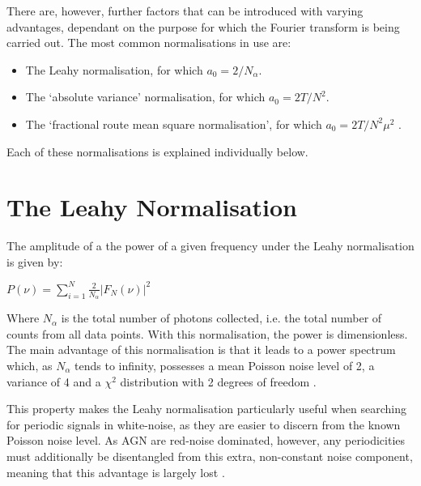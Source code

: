 \documentclass[letters,useAMS,usenatbib]{samnote}
\begin{document}
\setlength\parindent{20pt}
There are, however, further factors that can be introduced with varying advantages, dependant on the purpose for which the Fourier transform is being carried out. The most common normalisations in use are: \\
\begin{itemize}
\setlength{\itemindent}{0em}

\item The Leahy normalisation, for which $a_0 = 2/N_{\alpha}$\citep{leahy}.
\\ 
\item The `absolute variance' normalisation, for which $a_0 = 2T/N^2$. 
\\
\item The `fractional route mean square normalisation', for which $a_0 = 2T/N^2\mu^2$ \citep{vanderklis}.

\end{itemize}

\setlength\parindent{0pt}
Each of these normalisations is explained individually below.


\section{The Leahy Normalisation}

The amplitude of a the power of a given frequency under the Leahy normalisation is given by:

\vspace{\baselineskip}
\setlength\parindent{20pt}
$P(\nu)= \sum\limits_{i=1}^N \displaystyle\frac{2}{N_{\alpha}} |F_N(\nu)|^2$\\
\vspace{\baselineskip}

\setlength\parindent{0pt}
Where $N_{\alpha}$ is the total number of photons collected, i.e. the total number of counts from all data points. With this normalisation, the power is dimensionless. The main advantage of this normalisation is that it leads to a power spectrum which, as $N_{\alpha}$ tends to infinity, possesses a mean Poisson noise level of 2, a variance of 4 and a $\chi^2$ distribution with 2 degrees of freedom \citep{leahy}.

\setlength\parindent{20pt}
This property makes the Leahy normalisation particularly useful when searching for periodic signals in white-noise, as they are easier to discern from the known Poisson noise level. As AGN are red-noise dominated, however, any periodicities must additionally be disentangled from this extra, non-constant noise component, meaning that this advantage is largely lost \citep{vaughan}.
\end{document}
